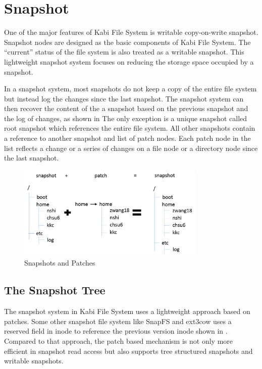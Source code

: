\chapter{Snapshot}
\label{chap:snapshot}
    One of the major features of Kabi File System is writable copy-on-write snapshot. Snapshot nodes are designed as the basic components of Kabi File System. The ``current'' status of the file system is also treated as a writable snapshot. This lightweight snapshot system focuses on reducing the storage space occupied by a snapshot.

    In a snapshot system, most snapshots do not keep a copy of the entire file system but instead log the changes since the last snapshot. The snapshot system can then recover the content of the a snapshot based on the previous snapshot and the log of changes, as shown in  The only exception is a unique snapshot called root snapshot which references the entire file system. All other snapshots contain a reference to another snapshot and list of patch nodes. Each patch node in the list reflects a change or a series of changes on a file node or a directory node since the last snapshot.

\begin{figure}[hbtp]
\centering
\includegraphics[width=0.8\textwidth]{Chapter-4/figs/fig23.png}
\caption{Snapshots and Patches}
\label{fig:snapshot_patch}
\end{figure}

\section{The Snapshot Tree}

	The snapshot system in Kabi File System uses a lightweight approach based on patches. Some other snapshot file system like SnapFS and ext3cow uses a reserved field in inode to reference the previous version inode shown in . Compared to that approach, the patch based mechanism is not only more efficient in snapshot read access but also supports tree structured snapshots and writable snapshots.

